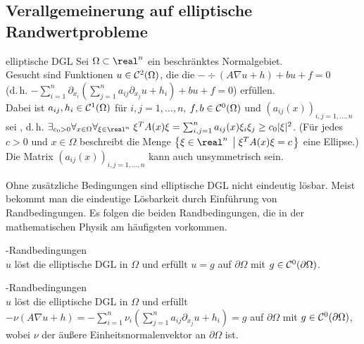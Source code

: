 \subsection{%
    Verallgemeinerung auf elliptische Randwertprobleme%
}

\begin{Def}{elliptische DGL}
    Sei $\Omega \subset \real^n$ ein beschränktes Normalgebiet.\\
    Gesucht sind Funktionen $u \in \mathcal{C}^2(\Omega)$, die die 
    $-\div(A \nabla u + h) + bu + f = 0$\\
    (d.\,h. $-\sum_{i=1}^n \partial_{x_i}
    \!\left(\sum_{j=1}^n a_{ij} \partial_{x_j} u + h_i\right) + bu + f = 0$)
    erfüllen.\\
    Dabei ist $a_{ij}, h_i \in \mathcal{C}^1(\Omega)$ für $i, j = 1, \dotsc, n$,
    $f, b \in \mathcal{C}^0(\Omega)$ und $(a_{ij}(x))_{i,j=1,\dotsc,n}$ sei
    , d.\,h.
    $\exists_{c_0 > 0} \forall_{x \in \Omega} \forall_{\xi \in \real^n}\;
    \xi^T A(x) \xi = \sum_{i,j=1}^n a_{ij}(x) \xi_i \xi_j \ge c_0 |\xi|^2$.
    (Für jedes $c > 0$ und $x \in \Omega$ beschreibt die Menge
    $\left\{\xi \in \real^n \;\left|\; \xi^T A(x) \xi = c\right.\right\}$
    eine Ellipse.)\\
    Die Matrix $(a_{ij}(x))_{i,j=1,\dotsc,n}$ kann auch unsymmetrisch sein.
\end{Def}

\begin{Bem}
    Ohne zusätzliche Bedingungen sind elliptische DGL nicht eindeutig lösbar.
    Meist bekommt man die eindeutige Lösbarkeit durch Einführung von Randbedingungen.
    Es folgen die beiden Randbedingungen, die in der mathematischen Physik am häufigsten
    vorkommen.
\end{Bem}

\begin{Def}{-Randbedingungen}\\
    $u$ löst die elliptische DGL in $\Omega$ und erfüllt
    $u = g$ auf $\partial\Omega$ mit $g \in \mathcal{C}^0(\partial\Omega)$.
\end{Def}

\begin{Def}{-Randbedingungen}\\
    $u$ löst die elliptische DGL in $\Omega$ und erfüllt
    $-\nu (A \nabla u + h) =
    -\sum_{i=1}^n \nu_i \left(\sum_{j=1}^n a_{ij} \partial_{x_j} u + h_i\right) = g$ auf
    $\partial\Omega$ mit $g \in \mathcal{C}^0(\partial\Omega)$, wobei $\nu$ der äußere
    Einheitsnormalenvektor an $\partial\Omega$ ist.
\end{Def}

